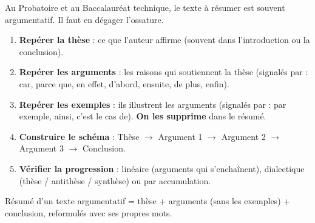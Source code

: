 \documentclass[11pt]{article}
\begin{document}
\begin{methode}
Au Probatoire et au Baccalauréat technique, le texte à résumer est souvent argumentatif. Il faut en dégager l'ossature.
\begin{enumerate}
\item \textbf{Repérer la thèse} : ce que l'auteur affirme (souvent dans l'introduction ou la conclusion).
\item \textbf{Repérer les arguments} : les raisons qui soutiennent la thèse (signalés par : car, parce que, en effet, d'abord, ensuite, de plus, enfin).
\item \textbf{Repérer les exemples} : ils illustrent les arguments (signalés par : par exemple, ainsi, c'est le cas de). \textbf{On les supprime} dans le résumé.
\item \textbf{Construire le schéma} : Thèse $\rightarrow$ Argument 1 $\rightarrow$ Argument 2 $\rightarrow$ Argument 3 $\rightarrow$ Conclusion.
\item \textbf{Vérifier la progression} : linéaire (arguments qui s'enchaînent), dialectique (thèse / antithèse / synthèse) ou par accumulation.
\end{enumerate}
\end{methode}

\begin{aretenir}
Résumé d'un texte argumentatif = thèse + arguments (sans les exemples) + conclusion, reformulés avec ses propres mots.
\end{aretenir}
\end{document}
